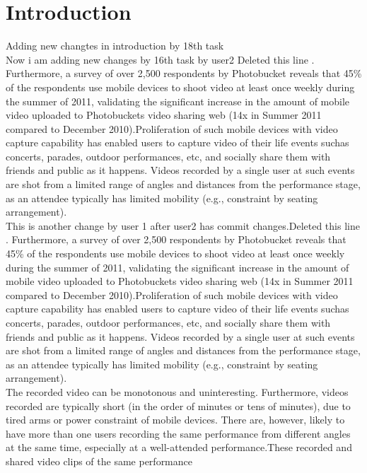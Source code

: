 \documentclass{sig-alternate}
\begin{document}
\section{Introduction}
Adding new changtes in introduction by 18th task\\
Now i am adding new changes by 16th task by user2 Deleted this line \cite{web:1}. Furthermore, a survey of over 2,500 respondents by Photobucket reveals that 45\% of the \cite{web:2} respondents use mobile devices to shoot video at least once weekly during the summer of 2011, validating the significant increase in the amount of mobile video uploaded to Photobucket\textquotesingle s video sharing web (14x in Summer 2011 compared to December 2010)\cite{web:3}.Proliferation of such mobile devices with video capture capability has enabled users to capture video of their life events suchas concerts, parades, outdoor performances, etc, and socially share them with friends and public as it happens. Videos recorded by a single user at such events are shot from a limited range of angles and distances from the performance stage, as an attendee typically has limited mobility (e.g., constraint by seating arrangement).\\
This is another change by user 1 after user2 has commit changes.Deleted this line \cite{web:1}. Furthermore, a survey of over 2,500 respondents by Photobucket reveals that 45\% of the \cite{web:2} respondents use mobile devices to shoot video at least once weekly during the summer of 2011, validating the significant increase in the amount of mobile video uploaded to Photobucket\textquotesingle s video sharing web (14x in Summer 2011 compared to December 2010)\cite{web:3}.Proliferation of such mobile devices with video capture capability has enabled users to capture video of their life events suchas concerts, parades, outdoor performances, etc, and socially share them with friends and public as it happens. Videos recorded by a single user at such events are shot from a limited range of angles and distances from the performance stage, as an attendee typically has limited mobility (e.g., constraint by seating arrangement).\\
\qquad  The recorded video can be monotonous and uninteresting. Furthermore, videos recorded are typically short (in the order of minutes or tens of minutes), due to tired arms or power constraint of mobile devices. There are, however, likely to have more than one users
recording the same performance from different angles at the same time, especially at a well-attended performance.These recorded and shared video clips of the same performance
\end{document}
